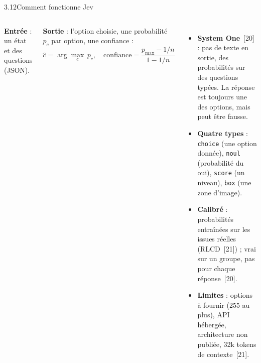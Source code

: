 \documentclass[11pt,aspectratio=169]{beamer}
\newcommand{\refs}[1]{{\color{mlblue}[#1]}}
\newcommand{\tok}[1]{\foreignlanguage{english}{\texttt{#1}}}
\begin{document}
\begin{frame}{3.12\quad Comment fonctionne Jev}
  \begin{columns}[T]
    \small
    \textbf{Entrée} : un état et des questions (JSON).

    \smallskip

    \smallskip
    \textbf{Sortie} : l'option choisie, une probabilité $p_c$ par option, une confiance :
    \[
      \hat c = \arg\max_c\, p_c, \quad
      \text{confiance} = \frac{p_{\max} - 1/n}{1 - 1/n}
    \]
    \small
    \begin{itemize}\setlength{\itemsep}{1pt}
      \item \textbf{System One}~\refs{20} : pas de texte en sortie, des probabilités sur
        des questions typées. La réponse est toujours une des options, mais peut être fausse.
      \item \textbf{Quatre types} : \tok{choice} (une option donnée), \tok{noul}
        (probabilité du oui), \tok{score} (un niveau), \tok{box} (une zone d'image).
      \item \textbf{Calibré} : probabilités entraînées sur les issues réelles
        (RLCD~\refs{21}) ; vrai sur un groupe, pas pour chaque réponse~\refs{20}.
      \item \textbf{Limites} : options à fournir (255 au plus), API hébergée, architecture
        non publiée, 32k tokens de contexte~\refs{21}.
    \end{itemize}
  \end{columns}
\end{frame}
\end{document}
